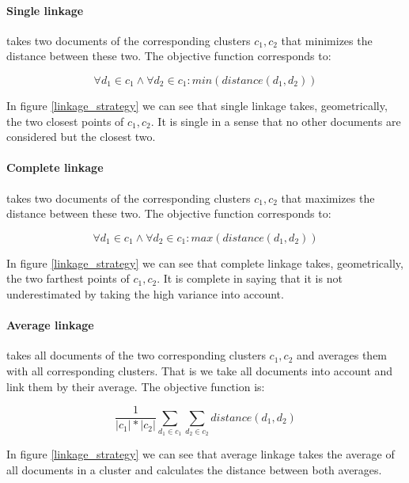     \paragraph{Single linkage} takes two documents of the corresponding clusters $c_1,c_2$ that minimizes the distance between these two. The objective function corresponds to:
      
      \begin{equation}
        \forall d_1 \in c_1 \wedge \forall d_2 \in c_1: min(distance(d_1, d_2))
      \end{equation}

    In figure \ref{linkage_strategy} we can see that single linkage takes, geometrically, the two closest points of $c_1,c_2$. It is single in a sense that no other documents are considered but the closest two.

    \paragraph{Complete linkage} takes two documents of the corresponding clusters $c_1,c_2$ that maximizes the distance between these two. The objective function corresponds to:
      
      \begin{equation}
        \forall d_1 \in c_1 \wedge \forall d_2 \in c_1: max(distance(d_1, d_2))
      \end{equation}

    In figure \ref{linkage_strategy} we can see that complete linkage takes, geometrically, the two farthest points of $c_1,c_2$. It is complete in saying that it is not underestimated by taking the high variance into account.

    \paragraph{Average linkage} takes all documents of the two corresponding clusters $c_1,c_2$ and averages them with all corresponding clusters. That is we take all documents into account and link them by their average. The objective function is:

      \begin{equation}
        \frac{1}{|c_1|*|c_2|} \sum_{d_1 \in c_1} \sum_{d_2 \in c_2} distance(d_1, d_2)
      \end{equation}

    In figure \ref{linkage_strategy} we can see that average linkage takes the average of all documents in a cluster and calculates the distance between both averages.

